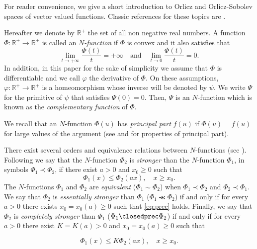 \documentclass[twoside]{elsarticle}
\theoremstyle{remark}
\renewcommand{\leq}{\leqslant}
\renewcommand{\geq}{\geqslant}
\begin{document}
For reader convenience, we give a short introduction to Orlicz and Orlicz-Sobolev spaces of vector valued functions. Classic references for these topics are \cite{adams_sobolev,KR,rao1991theory,M}.

Hereafter we denote  by $\mathbb{R}^+$  the set of all non negative real numbers. A function $\Phi:\mathbb{R}^+\to \mathbb{R}^+ $ is called an \emph{$N$-function} if $\Phi$ is convex and it also satisfies that
\[
\lim_{t\to+\infty}\frac{\Phi(t)}{t}=+\infty\quad\text{and}\quad \lim_{t\to 0}\frac{\Phi(t)}{t}=0.
\]
In addition,  in this paper for the sake of simplicity  we assume that $\Phi$ is differentiable and we call $\varphi$  the derivative of $\Phi$.
On these assumptions, $\varphi:\mathbb{R}^+\rightarrow \mathbb{R}^+$ is a homeomorphism whose inverse will be denoted by $\psi$.
We write $\Psi$ for the primitive of $\psi$ that satisfies $\Psi(0)=0$. Then, $\Psi$ is an $N$-function which  is known as the \emph{complementary function} of $\Phi$.

 We recall that an $N$-function $\Phi(u)$ has \emph{principal part} $f(u)$ if $\Phi(u)=f(u)$ for large values of the argument (see \cite[p. 16]{KR} and \cite[Sec. 7]{KR} for  properties of principal part).

There exist several orders and equivalence relations between $N$-functions (see \cite[Sec. 2.2]{rao1991theory}).
Following \cite[Def. 1, pp. 15-16]{rao1991theory} we say that the   $N$-function $\Phi_2$ is \emph{stronger} than the $N$-function  $\Phi_1$, in symbols  $\Phi_1\prec\Phi_2$, if  there exist $a>0$ and $x_0\geq 0$ such that
\begin{equation}\label{eq:prec}\Phi_1(x)\leq \Phi_2(ax), \quad x\geq x_0.\end{equation}
 The $N$-functions  $\Phi_1$ and   $\Phi_2$ are \emph{equivalent} ($\Phi_1\sim\Phi_2$)  when  $\Phi_1\prec\Phi_2$ and $\Phi_2\prec\Phi_1$.
We say that  $\Phi_2$ is \emph{essentially stronger} than  $\Phi_1$  ($\Phi_1\llcurly\Phi_2$) if and only if for every $a>0$ there exists $x_0=x_0(a)\geq 0$ such that \eqref{eq:prec} holds. Finally, we say that  $\Phi_2$ is \emph{completely stronger} than  $\Phi_1$  ($\Phi_1\closedprec\Phi_2$) if and only if for every $a>0$ there exist $K=K(a)>0$ and  $x_0=x_0(a)\geq 0$ such that


\begin{equation}\label{eq:prec2}\Phi_1(x)\leq K\Phi_2(ax), \quad x\geq x_0.\end{equation}
\end{document}
